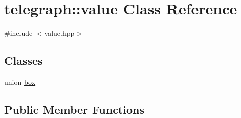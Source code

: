 \hypertarget{classtelegraph_1_1value}{}\section{telegraph\+:\+:value Class Reference}
\label{classtelegraph_1_1value}


{\ttfamily \#include $<$value.\+hpp$>$}

\subsection*{Classes}
\begin{DoxyCompactItemize}
\item 
union \hyperlink{uniontelegraph_1_1value_1_1box}{box}
\end{DoxyCompactItemize}
\subsection*{Public Member Functions}
